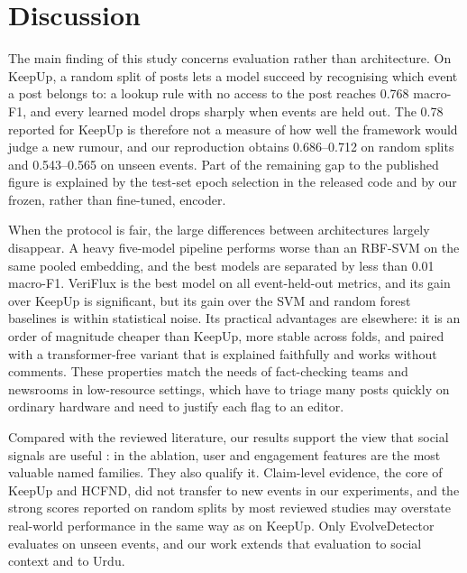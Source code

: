 \documentclass[conference]{IEEEtran}
\begin{document}
\section{Discussion}
\label{sec:discussion}
The main finding of this study concerns evaluation rather than architecture. On KeepUp, a random split of posts
lets a model succeed by recognising which event a post belongs to: a lookup rule with no access to the post reaches
0.768 macro-F1, and every learned model drops sharply when events are held out. The 0.78 reported for KeepUp is
therefore not a measure of how well the framework would judge a new rumour, and our reproduction obtains
0.686--0.712 on random splits and 0.543--0.565 on unseen events. Part of the remaining gap to the published figure
is explained by the test-set epoch selection in the released code and by our frozen, rather than fine-tuned,
encoder.

When the protocol is fair, the large differences between architectures largely disappear. A heavy five-model
pipeline performs worse than an RBF-SVM on the same pooled embedding, and the best models are separated by less
than 0.01 macro-F1. VeriFlux is the best model on all event-held-out metrics, and its gain over KeepUp is
significant, but its gain over the SVM and random forest baselines is within statistical noise. Its practical
advantages are elsewhere: it is an order of magnitude cheaper than KeepUp, more stable across folds, and paired
with a transformer-free variant that is explained faithfully and works without comments. These properties match
the needs of fact-checking teams and newsrooms in low-resource settings, which have to triage many posts quickly
on ordinary hardware and need to justify each flag to an editor.

Compared with the reviewed literature, our results support the view that social signals are useful
\cite{almutair2025msdsi,nivedita2026hgcm}: in the ablation, user and engagement features are the most valuable
named families. They also qualify it. Claim-level evidence, the core of KeepUp and HCFND, did not transfer to new
events in our experiments, and the strong scores reported on random splits by most reviewed studies may overstate
real-world performance in the same way as on KeepUp. Only EvolveDetector \cite{ding2025evolvedetector} evaluates
on unseen events, and our work extends that evaluation to social context and to Urdu.
\end{document}
